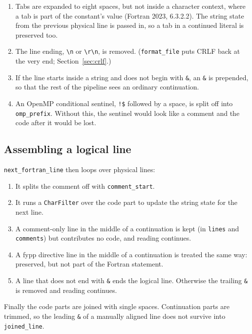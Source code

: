 \documentclass[11pt,a4paper,openany]{book}
\newcommand{\code}[1]{\texttt{\small #1}}
\begin{document}
\begin{enumerate}
  \item Tabs are expanded to eight spaces, but not inside a character
    context, where a tab is part of the constant's value (Fortran 2023,
    6.3.2.2). The string state from the previous physical line is passed in, so
    a tab in a continued literal is preserved too.
  \item The line ending, \code{\textbackslash n} or \code{\textbackslash r\textbackslash n}, is removed. (\code{format\_file}
    puts CRLF back at the very end; Section~\ref{sec:crlf}.)
  \item If the line starts inside a string and does not begin with \code{\&},
    an \code{\&} is prepended, so that the rest of the pipeline sees an
    ordinary continuation.
  \item An OpenMP conditional sentinel, \code{!\$} followed by a space, is
    split off into \code{omp\_prefix}. Without this, the sentinel would look
    like a comment and the code after it would be lost.
\end{enumerate}

\subsection{Assembling a logical line}

\code{next\_fortran\_line} then loops over physical lines:

\begin{enumerate}
  \item It splits the comment off with \code{comment\_start}.
  \item It runs a \code{CharFilter} over the code part to update the string
    state for the next line.
  \item A comment-only line in the middle of a continuation is kept (in
    \code{lines} and \code{comments}) but contributes no code, and reading
    continues.
  \item A fypp directive line in the middle of a continuation is treated the
    same way: preserved, but not part of the Fortran statement.
  \item A line that does not end with \code{\&} ends the logical line.
    Otherwise the trailing \code{\&} is removed and reading continues.
\end{enumerate}

Finally the code parts are joined with single spaces. Continuation parts are
trimmed, so the leading \code{\&} of a manually aligned line does not survive
into \code{joined\_line}.
\end{document}
